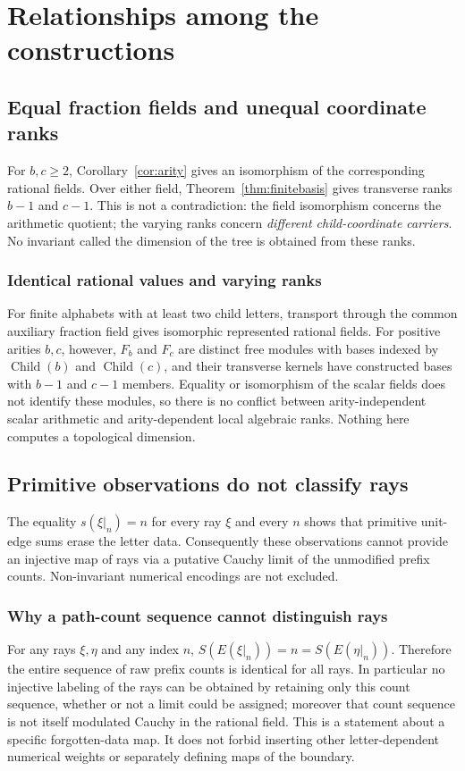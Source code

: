 \documentclass[11pt,reqno]{amsart}
\theoremstyle{definition}\newtheorem{definition}[theorem]{Definition}
\theoremstyle{remark}\newtheorem{remark}[theorem]{Remark}
\newcommand{\Fin}{\operatorname{Child}}
\begin{document}
\clearpage
\section{Relationships among the constructions}\label{sec:relationships}
\subsection{Equal fraction fields and unequal coordinate ranks}\label{main:sub-56}
For $b,c\ge2$, Corollary~\ref{cor:arity} gives an isomorphism of the corresponding rational fields. Over either field, Theorem~\ref{thm:finitebasis} gives transverse ranks $b-1$ and $c-1$. This is not a contradiction: the field isomorphism concerns the arithmetic quotient; the varying ranks concern \emph{different child-coordinate carriers}. No invariant called the dimension of the tree is obtained from these ranks.

\medskip
\subsubsection*{Identical rational values and varying ranks}\label{supp:15-1}
For finite alphabets with at least two child letters, transport through the common auxiliary fraction field gives isomorphic represented rational fields. For positive arities $b,c$, however, $F_b$ and $F_c$ are distinct free modules with bases indexed by $\Fin(b)$ and $\Fin(c)$, and their transverse kernels have constructed bases with $b-1$ and $c-1$ members. Equality or isomorphism of the scalar fields does not identify these modules, so there is no conflict between arity-independent scalar arithmetic and arity-dependent local algebraic ranks. Nothing here computes a topological dimension.
\medskip

\subsection{Primitive observations do not classify rays}\label{main:sub-57}
The equality $s(\xi|_n)=n$ for every ray $\xi$ and every $n$ shows that primitive unit-edge sums erase the letter data. Consequently these observations cannot provide an injective map of rays via a putative Cauchy limit of the unmodified prefix counts. Non-invariant numerical encodings are not excluded.

\medskip
\subsubsection*{Why a path-count sequence cannot distinguish rays}\label{supp:15-2}
For any rays $\xi,\eta$ and any index $n$, $S(E(\xi|_n))=n=S(E(\eta|_n))$. Therefore the entire sequence of raw prefix counts is identical for all rays. In particular no injective labeling of the rays can be obtained by retaining only this count sequence, whether or not a limit could be assigned; moreover that count sequence is not itself modulated Cauchy in the rational field. This is a statement about a specific forgotten-data map. It does not forbid inserting other letter-dependent numerical weights or separately defining maps of the boundary.
\medskip
\end{document}
